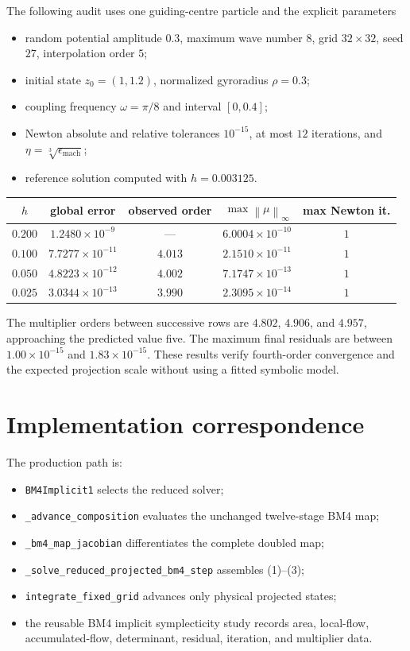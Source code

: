 \documentclass[11pt,a4paper]{article}
\newcommand{\norm}[1]{\left\lVert #1\right\rVert}
\begin{document}
The following audit uses one guiding-centre particle and the explicit parameters
\begin{itemize}
 \item random potential amplitude $0.3$, maximum wave number $8$, grid
       $32\times32$, seed $27$, interpolation order $5$;
 \item initial state $z_0=(1,1.2)$, normalized gyroradius $\rho=0.3$;
 \item coupling frequency $\omega=\pi/8$ and interval $[0,0.4]$;
 \item Newton absolute and relative tolerances $10^{-15}$, at most $12$
       iterations, and $\eta=\sqrt[3]{\epsilon_{\mathrm{mach}}}$;
 \item reference solution computed with $h=0.003125$.
\end{itemize}

\begin{center}
\small
\begin{tabular}{@{}ccccc@{}}
\toprule
$h$ & global error & observed order & $\max\norm{\mu}_\infty$ & max Newton it.\\
\midrule
$0.200$ & $1.2480\times10^{-9}$  & ---    & $6.0004\times10^{-10}$ & $1$\\
$0.100$ & $7.7277\times10^{-11}$ & $4.013$& $2.1510\times10^{-11}$ & $1$\\
$0.050$ & $4.8223\times10^{-12}$ & $4.002$& $7.1747\times10^{-13}$ & $1$\\
$0.025$ & $3.0344\times10^{-13}$ & $3.990$& $2.3095\times10^{-14}$ & $1$\\
\bottomrule
\end{tabular}
\end{center}

The multiplier orders between successive rows are $4.802$, $4.906$, and
$4.957$, approaching the predicted value five.  The maximum final residuals are
between $1.00\times10^{-15}$ and $1.83\times10^{-15}$.  These results verify
fourth-order convergence and the expected projection scale without using a
fitted symbolic model.

\section{Implementation correspondence}

The production path is:
\begin{itemize}
 \item \texttt{BM4Implicit1} selects the reduced solver;
 \item \texttt{\_advance\_composition} evaluates the unchanged twelve-stage BM4 map;
 \item \texttt{\_bm4\_map\_jacobian} differentiates the complete doubled map;
 \item \texttt{\_solve\_reduced\_projected\_bm4\_step} assembles (1)--(3);
 \item \texttt{integrate\_fixed\_grid} advances only physical projected states;
 \item the reusable BM4 implicit symplecticity study records area, local-flow,
       accumulated-flow, determinant, residual, iteration, and multiplier data.
\end{itemize}
\end{document}
